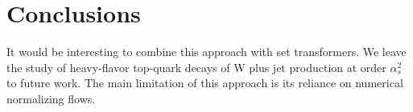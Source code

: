 \section{Conclusions}\label{sec:conclusions}

It would be interesting to combine this approach with set transformers.
We leave the study of heavy-flavor top-quark decays of W plus jet
production at order $\alpha_s^2$ to future work. The main limitation of
this approach is its reliance on numerical normalizing flows.

